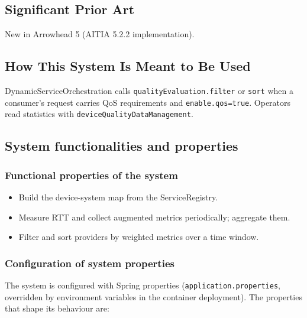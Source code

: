 \documentclass[a4paper]{arrowhead}
\begin{document}
\newpage

\subsection{Significant Prior Art}
\label{sec:prior_art}

New in Arrowhead 5 (AITIA 5.2.2 implementation).

\subsection{How This System Is Meant to Be Used}
\label{sec:use}

Dynamic\allowbreak{}Service\allowbreak{}Orchestration calls \texttt{quality\allowbreak{}Evaluation.\allowbreak{}filter} or \texttt{sort} when a consumer's request carries QoS requirements and \texttt{enable.\allowbreak{}qos=\allowbreak{}true}. Operators read statistics with \texttt{device\allowbreak{}Quality\allowbreak{}Data\allowbreak{}Management}.

\subsection{System functionalities and properties}
\label{sec:properties}

\subsubsection{Functional properties of the system}

\begin{itemize}
  \item Build the device-system map from the ServiceRegistry.
  \item Measure RTT and collect augmented metrics periodically; aggregate them.
  \item Filter and sort providers by weighted metrics over a time window.
\end{itemize}

\subsubsection{Configuration of system properties}

The system is configured with Spring properties (\texttt{application.properties}, overridden by environment variables in the container deployment). The properties that shape its behaviour are:
\end{document}
